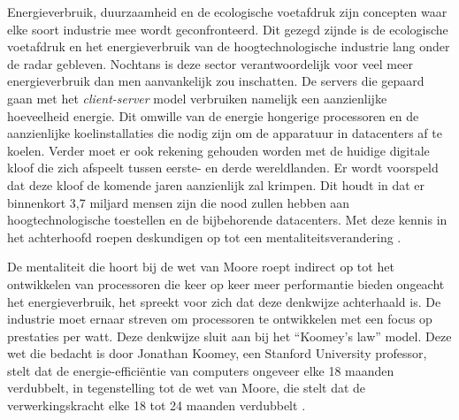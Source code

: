 Energieverbruik, duurzaamheid en de ecologische voetafdruk zijn concepten waar elke soort industrie mee wordt geconfronteerd. Dit gezegd zijnde is de ecologische voetafdruk en het energieverbruik van de hoogtechnologische industrie lang onder de radar gebleven. Nochtans is deze sector verantwoordelijk voor veel meer energieverbruik dan men aanvankelijk zou inschatten. De servers die gepaard gaan met het \textit{client-server} model verbruiken namelijk een aanzienlijke hoeveelheid energie. Dit omwille van de energie hongerige processoren en de aanzienlijke koelinstallaties die nodig zijn om de apparatuur in datacenters af te koelen. Verder moet er ook rekening gehouden worden met de huidige digitale kloof die zich afspeelt tussen eerste- en derde wereldlanden. Er wordt voorspeld dat deze kloof de komende jaren aanzienlijk zal krimpen. Dit houdt in dat er binnenkort 3,7 miljard mensen zijn die nood zullen hebben aan hoogtechnologische toestellen en de bijbehorende datacenters. Met deze kennis in het achterhoofd roepen deskundigen op tot een mentaliteitsverandering \autocite{Aitken2021}.


De mentaliteit die hoort bij de wet van Moore roept indirect op tot het ontwikkelen van processoren die keer op keer meer performantie bieden ongeacht het energieverbruik, het spreekt voor zich dat deze denkwijze achterhaald is. De industrie moet ernaar streven om processoren te ontwikkelen met een focus op prestaties per watt. Deze denkwijze sluit aan bij het “Koomey’s law” model. Deze wet die bedacht is door Jonathan Koomey, een Stanford University professor, stelt dat de energie-efficiëntie van computers ongeveer elke 18 maanden verdubbelt, in tegenstelling tot de wet van Moore, die stelt dat de verwerkingskracht elke 18 tot 24 maanden verdubbelt \autocite{Koomey2011}.

